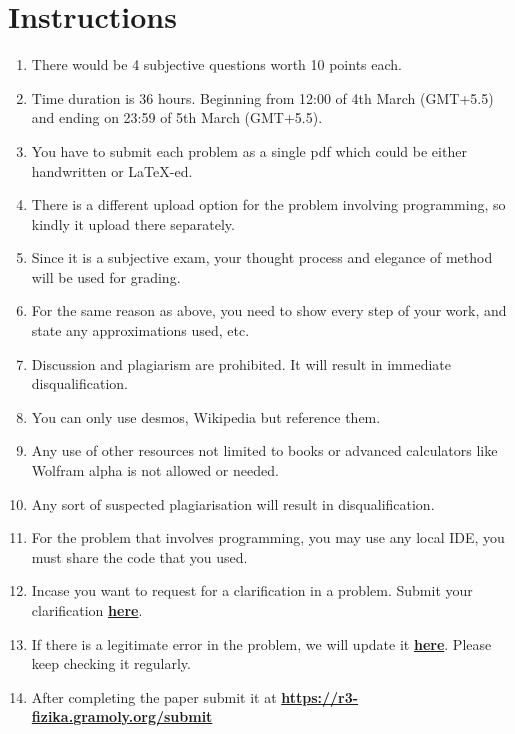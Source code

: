 \section*{Instructions}

\begin{enumerate}
\item There would be 4 subjective questions worth 10 points each.
\item Time duration is 36 hours. Beginning from 12:00 of 4th March (GMT+5.5) and ending on 23:59 of 5th March (GMT+5.5).
\item You have to submit each problem as a single pdf which could be either handwritten or LaTeX-ed.
\item There is a different upload option for the problem involving programming, so kindly it upload there separately.
\item Since it is a subjective exam, your thought process and elegance of method will be used for grading.
\item For the same reason as above, you need to show every step of your work, and state any approximations used, etc.
\item Discussion and plagiarism are prohibited. It will result in immediate disqualification. 
\item You can only use desmos, Wikipedia but reference them.
\item Any use of other resources not limited to books or advanced calculators like Wolfram alpha is not allowed or needed.
\item Any sort of suspected plagiarisation will result in disqualification.
\item For the problem that involves programming, you may use any local IDE, you must share the code that you used.
\item Incase you want to request for a clarification in a problem. Submit your clarification \colorbox{myorg}{\href{https://r3-fizika.gramoly.org/clarification}{\textbf{here}}}.
\item If there is a legitimate error in the problem, we will update it \colorbox{myorg}{\href{https://r3-fizika.gramoly.org/update}{\textbf{here}}}. Please keep checking it regularly.
\item After completing the paper submit it at  
\colorbox{myorg}{\textbf{\url{https://r3-fizika.gramoly.org/submit}}}
\end{enumerate}

